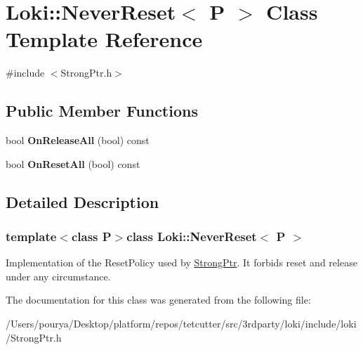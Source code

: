 \hypertarget{structLoki_1_1NeverReset}{}\section{Loki\+:\+:Never\+Reset$<$ P $>$ Class Template Reference}
\label{structLoki_1_1NeverReset}


{\ttfamily \#include $<$Strong\+Ptr.\+h$>$}

\subsection*{Public Member Functions}
\begin{DoxyCompactItemize}
\item 
\hypertarget{structLoki_1_1NeverReset_aa3d4fafdc2ae156b52d97566ce7ebea0}{}bool {\bfseries On\+Release\+All} (bool) const \label{structLoki_1_1NeverReset_aa3d4fafdc2ae156b52d97566ce7ebea0}

\item 
\hypertarget{structLoki_1_1NeverReset_af17a34b5b001e5dca56cad11010d41ef}{}bool {\bfseries On\+Reset\+All} (bool) const \label{structLoki_1_1NeverReset_af17a34b5b001e5dca56cad11010d41ef}

\end{DoxyCompactItemize}


\subsection{Detailed Description}
\subsubsection*{template$<$class P$>$class Loki\+::\+Never\+Reset$<$ P $>$}

Implementation of the Reset\+Policy used by \hyperlink{classLoki_1_1StrongPtr}{Strong\+Ptr}. It forbids reset and release under any circumstance. 

The documentation for this class was generated from the following file\+:\begin{DoxyCompactItemize}
\item 
/\+Users/pourya/\+Desktop/platform/repos/tetcutter/src/3rdparty/loki/include/loki/Strong\+Ptr.\+h\end{DoxyCompactItemize}
